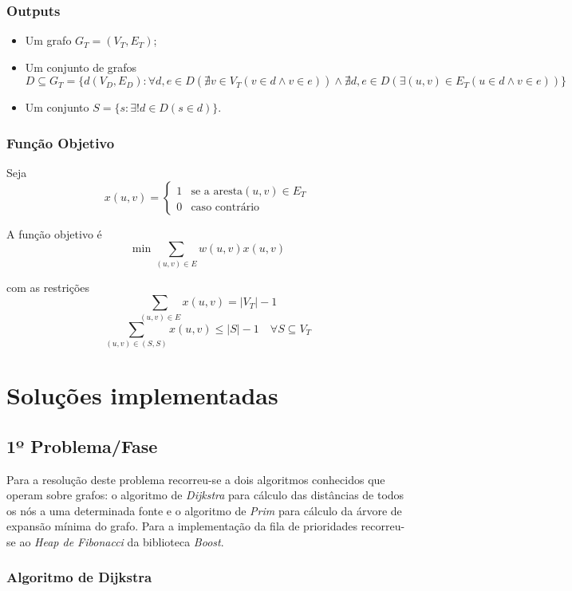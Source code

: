 \documentclass[a4paper,12pt,titlepage]{article}
\begin{document}
\subsubsection*{Outputs}
\begin{itemize}
\item Um grafo $G_T = ( V_T,E_T )$;
\item Um conjunto de grafos $D \subseteq G_T = \{d(V_D,E_D): \forall d,e \in D(\nexists v \in V_T(v \in d \land v \in e)) \land \nexists d,e\in D(\exists(u,v) \in E_T(u \in d \land v \in e)) \}$
\item Um conjunto $S = \{s : \exists! d \in D(s \in d)\}$.
\end{itemize}

\subsubsection*{Função Objetivo}
Seja $$x(u,v) = \begin{cases}
1 & \text{se a aresta} (u,v) \in E_T\\
0 & \text{caso contrário} 
\end{cases}$$

A função objetivo é\cite{ieor_mst}
$$\min \sum_{(u,v)\in E} w(u,v)x(u,v)$$

com as restrições 
$$\sum_{(u,v)\in E} x(u,v) = |V_T| - 1$$
$$\sum_{(u,v)\in (S,S)} x(u,v) \leq |S| - 1 \quad \forall S \subseteq V_T$$
\linebreak
\linebreak
\linebreak
\linebreak
\section{Soluções implementadas}
\subsection{1º Problema/Fase}
Para a resolução deste problema recorreu-se a dois algoritmos conhecidos que operam sobre grafos: o algoritmo de \emph{Dijkstra} para cálculo das distâncias de todos os nós a uma determinada fonte e o algoritmo de \emph{Prim} para cálculo da árvore de expansão mínima do grafo. Para a implementação da fila de prioridades recorreu-se ao \emph{Heap de Fibonacci} da biblioteca \emph{Boost}. 
\subsubsection{Algoritmo de Dijkstra}
\end{document}
